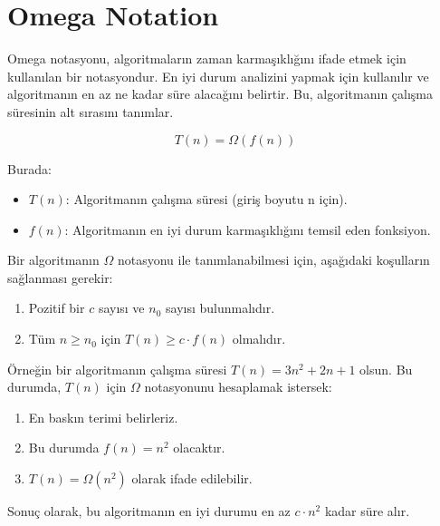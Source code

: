 \section{Omega Notation}

Omega notasyonu, algoritmaların zaman karmaşıklığını ifade etmek için kullanılan bir notasyondur. En iyi durum analizini yapmak için kullanılır ve algoritmanın en az ne kadar süre alacağını belirtir. Bu, algoritmanın çalışma süresinin alt sırasını tanımlar.

\[ T(n) = \Omega(f(n)) \]

Burada:

\begin{itemize}
    \item $T(n)$: Algoritmanın çalışma süresi (giriş boyutu n için).
    \item $f(n)$: Algoritmanın en iyi durum karmaşıklığını temsil eden fonksiyon.
\end{itemize}

Bir algoritmanın $\Omega$ notasyonu ile tanımlanabilmesi için, aşağıdaki koşulların sağlanması gerekir:

\begin{enumerate}
    \item Pozitif bir $c$ sayısı ve $n_0$ sayısı bulunmalıdır.
    \item Tüm $n \geq n_0$ için $T(n) \geq c \cdot f(n)$ olmalıdır.
\end{enumerate}

Örneğin bir algoritmanın çalışma süresi $T(n) = 3n^2 + 2n + 1$ olsun. Bu durumda, $T(n)$ için $\Omega$ notasyonunu hesaplamak istersek:

\begin{enumerate}
    \item En baskın terimi belirleriz.
    \item Bu durumda $f(n) = n^2$ olacaktır.
    \item $T(n) = \Omega(n^2)$ olarak ifade edilebilir.
\end{enumerate}

Sonuç olarak, bu algoritmanın en iyi durumu en az $c \cdot n^2$ kadar süre alır.

\newpage